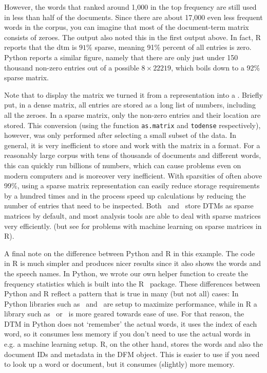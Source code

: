 However, the words that ranked around 1,000 in the top frequency are still used in less than half of the documents.
Since there are about 17,000 even less frequent words in the corpus, you can imagine that most of the document-term matrix consists of zeroes. 
The output also noted this  in the first output above.
In fact, R reports that the dtm is $91\%$ sparse, meaning 91\% percent of all entries is zero.
Python reports a similar figure, namely that there are only just under 150 thousand non-zero entries
out of a possible $8\times22219$, which boils down to a 92\% sparse matrix.

Note that to display the matrix we turned it from a  representation into a .
Briefly put, in a dense matrix, all entries are stored as a long list of numbers, including all the zeroes.
In a sparse matrix,  only the non-zero entries and their location are stored. 
This conversion (using the function \verb|as.matrix| and \verb|todense| respectively), however, was only performed after selecting a small subset of the data.
In general,  it is very inefficient to store and work with the matrix in a  format.
For a reasonably large corpus with tens of thousands of documents and different words, this can quickly run billions of numbers,
which can cause problems even on modern computers and is moreover very inefficient.
With sparsities of often above 99\%, using a sparse matrix representation can easily reduce storage requirements by a hundred times and in the process speed up calculations by reducing the number of entries that need to be inspected.
Both \quanteda\ and \sklearn\ store DTMs as sparse matrices by default,
and most analysis tools are able to deal with sparse matrices very efficiently.
(but see  for problems with machine learning on sparse matrices in R). 

A final note on the difference between Python and R in this example.
The code in R is much simpler and produces nicer results since it also shows the words and the speech names.
In Python, we wrote our own helper function to create the frequency statistics which is built into the R \quanteda\ package.
These differences between Python and R reflect a pattern that is true in many (but not all) cases:
In Python libraries such as \numpy\ and \sklearn\ are setup to maximize performance,
while in R a library such as \quanteda\ or \tidyverse\ is more geared towards ease of use.
For that reason, the DTM in Python does not `remember' the actual words, it uses the index of each word,
so it consumes less memory if you don't need to use the actual words in e.g. a machine learning setup.
R, on the other hand, stores the words and also the document IDs and metadata in the DFM object.
This is easier to use if you need to look up a word or document, but it consumes (slightly) more memory. 


